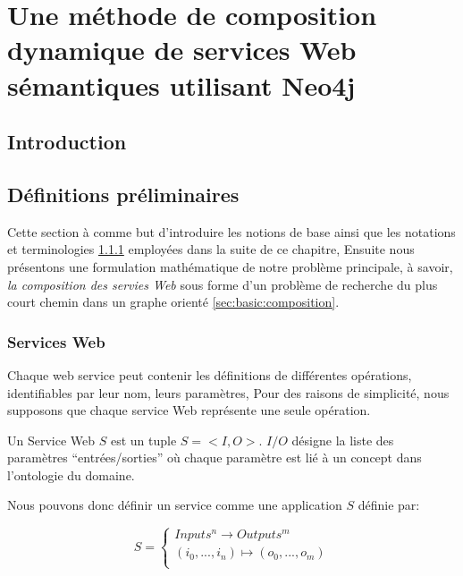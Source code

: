\chapter{Une méthode de composition dynamique de services Web
  sémantiques utilisant Neo4j}
\label{ch:approche}

\section*{Introduction}
 

\newpage
\section{Définitions préliminaires}
\label{sec:basic-defs}
Cette section à comme but d'introduire les notions de base ainsi que
les notations et terminologies \ref{sec:basic:ws} employées dans la
suite de ce chapitre, Ensuite nous présentons une formulation
mathématique de notre problème principale, à savoir, \textit{la
  composition des servies Web} sous forme d'un problème de recherche
du plus court chemin dans un graphe orienté
\ref{sec:basic:composition}.\medskip

  \subsection{Services Web}
  \label{sec:basic:ws}
  Chaque web service peut contenir les définitions de différentes
  opérations, identifiables par leur nom, leurs paramètres, Pour des
  raisons de simplicité, nous supposons que chaque service Web
  représente une seule opération.

  \begin{mydef}
    Un Service Web $S$ est un tuple $S = <I,O>$. $I/O$ désigne la
    liste des paramètres ``entrées/sorties'' où chaque paramètre est
    lié à un concept dans l'ontologie du domaine.
   \end{mydef}

  

  Nous pouvons donc définir un service comme une application $S$
  définie par:

   \[ S =
     \begin{cases}
       Inputs^n  \to Outputs^m \\
       (i_0, ..., i_n ) \mapsto (o_0, ..., o_m)\\
     \end{cases}
   \]\medskip

